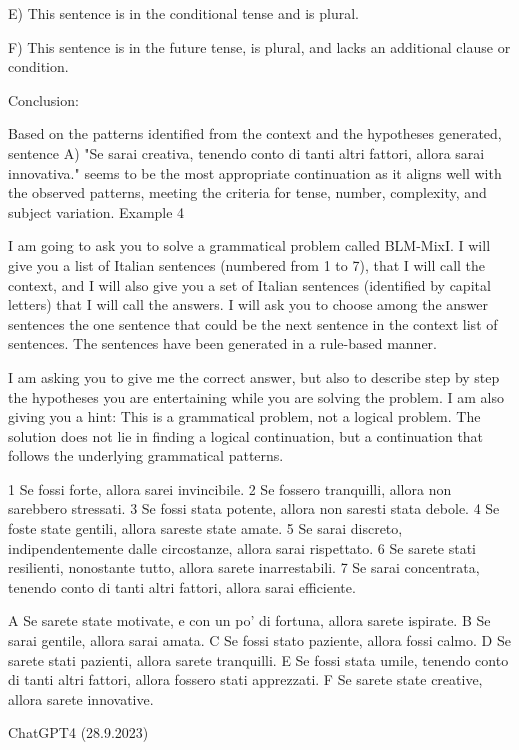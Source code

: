 E) This sentence is in the conditional tense and is plural.

F) This sentence is in the future tense, is plural, and lacks an additional clause or condition.

Conclusion:

Based on the patterns identified from the context and the hypotheses generated, sentence A) "Se sarai creativa, tenendo conto di tanti altri fattori, allora sarai innovativa." seems to be the most appropriate continuation as it aligns well with the observed patterns, meeting the criteria for tense, number, complexity, and subject variation.
Example 4

I am going to ask you to solve a grammatical problem called BLM-MixI.  I will give you a list of Italian sentences (numbered from 1 to 7), that I will call the context, and I will also give you a set of Italian sentences (identified by capital letters) that I will call  the answers. I will ask you to choose among the answer sentences the one sentence that could be the next sentence in the context list of sentences. The sentences have been generated in a rule-based manner. 

I am asking you to give me the correct answer, but also to describe step by step  the hypotheses you are entertaining while you are solving the problem.
I am also giving you a hint: This is a grammatical problem, not a logical problem. The solution does not lie in finding a logical continuation, but a continuation that follows the underlying grammatical patterns.

1 Se fossi forte, allora sarei invincibile.
2 Se fossero tranquilli, allora non sarebbero stressati.
3 Se fossi stata potente, allora non saresti stata debole.
4 Se foste state gentili, allora sareste state amate.
5 Se sarai discreto, indipendentemente dalle circostanze, allora sarai rispettato.
6 Se sarete stati resilienti, nonostante tutto, allora sarete inarrestabili.
7 Se sarai concentrata, tenendo conto di tanti altri fattori, allora sarai efficiente.

A Se sarete state motivate, e con un po' di fortuna, allora sarete ispirate.
B Se sarai gentile, allora sarai amata.
C Se fossi stato paziente, allora fossi calmo.
D Se sarete stati pazienti, allora sarete tranquilli.
E Se fossi stata umile, tenendo conto di tanti altri fattori, allora fossero stati apprezzati.
F Se sarete state creative, allora sarete innovative.

ChatGPT4 (28.9.2023)

